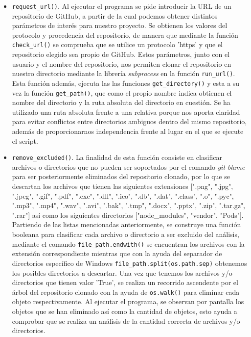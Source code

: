 \documentclass[a4paper, 12pt]{book}
\begin{document}
\begin{itemize}
  \item \texttt{request\_url()}. Al ejecutar el programa se pide introducir la URL de un repositorio de GitHub, a partir de la cual podemos obtener distintos parámetros de interés para nuestro proyecto. Se obtienen los valores del protocolo y procedencia del
  repositorio, de manera que mediante la función \texttt{check\_url()} se comprueba que se utilice un protocolo 'https' y que el repositorio elegido sea propio de GitHub. Estos parámetros, junto con el usuario y el nombre del repositorio, nos permiten clonar
  el repositorio en nuestro directorio mediante la librería \textit{subprocess} en la función \texttt{run\_url()}. Esta función además, ejecuta las las funciones \texttt{get\_directory()} y esta a su vez la función \texttt{get\_path()}, que como el propio nombre
  indica obtienen el nombre del directorio y la ruta absoluta del directorio en cuestión. Se ha utilizado una ruta absoluta frente a una relativa porque nos aporta claridad para evitar conflictos entre directorios ambiguos dentro del mismo repositorio, además de
  proporcionarnos independencia frente al lugar en el que se ejecute el script.

  \item \texttt{remove\_excluded()}. La finalidad de esta función consiste en clasificar archivos o directorios que no pueden ser soportados por el comando \textit{git blame} para ser posteriormente eliminados del repositorio clonado, por lo que 
  se descartan los archivos que tienen las siguientes extensiones [".png", ".jpg", ".jpeg", ".gif", ".pdf", ".exe", ".dll", ".ico", ".db", ".dat", ".class", ".o", ".pyc", ".mp3", ".mp4", ".wav", ".avi", ".bak", ".tmp", ".docx", ".pptx", ".zip",
  ".tar.gz", ".rar"] así como los siguientes directorios ["node\_modules", "vendor", "Pods"].
  \\Partiendo de las listas mencionadas anteriormente, se construye una función booleana para clasificar cada archivo o directorio a ser excluido del análisis, mediante el comando \texttt{file\_path.endwith()} se encuentran los archivos con la
  extensión correspondiente mientras que con la ayuda del separador de directorios específico de Windows \texttt{file\_path.split(os.path.sep)} obtenemos los posibles directorios a descartar. Una vez que tenemos los archivos y/o directorios que 
  tienen valor 'True', se realiza un recorrido ascendente por el árbol del repositorio clonado con la ayuda de \texttt{os.walk()} para eliminar cada objeto respectivamente. Al ejecutar el programa, se observan por pantalla los objetos que 
  se han eliminado así como la cantidad de objetos, esto ayuda a comprobar que se realiza un análisis de la cantidad correcta de archivos y/o directorios. 


\end{itemize}
\end{document}
